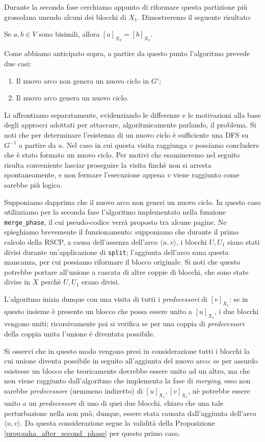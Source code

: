 Durante la seconda fase cerchiamo appunto di riformare questa partizione più grossolana unendo alcuni dei blocchi di $X_1$. Dimostreremo il seguente risultato:
\begin{proposition}
    \label{prop:saha_after_second_phase}
    Se $a,b \in V$ sono bisimili, allora $[a]_{X_2} = [b]_{X_2}$.
\end{proposition}

Come abbiamo anticipato sopra, a partire da questo punto l'algoritmo prevede due casi:
\begin{enumerate}
    \item Il nuovo arco non genera un nuovo ciclo in $G'$;
    \item Il nuovo arco genera un nuovo ciclo.
\end{enumerate}
Li affrontiamo separatamente, evidenziando le differenze e le motivazioni alla base degli approcci adottati per attaccare, algoritmicamente parlando, il problema. Si noti che per determinare l'esistenza di un nuovo ciclo è sufficiente una DFS su $G^{-1}$ a partire da $u$. Nel caso in cui questa visita raggiunga $v$ possiamo concludere che è stato formato un nuovo ciclo. Per motivi che esamineremo nel seguito risulta conveniente lasciar proseguire la visita finchè non si arresta spontaneamente, e non fermare l'esecuzione appena $v$ viene raggiunto come sarebbe più logico.

Supponiamo dapprima che il nuovo arco non generi un nuovo ciclo. In questo caso utilizziamo per la seconda fase l'algoritmo implementato nella funzione \texttt{merge\_phase}, il cui pseudo-codice verrà proposto tra alcune pagine. Ne spieghiamo brevemente il funzionamento: supponiamo che durante il primo calcolo della RSCP, a causa dell'assenza dell'arco $\langle u, v \rangle$, i blocchi $U,U_1$ siano stati divisi durante un'applicazione di \texttt{split}; l'aggiunta dell'arco sana questa mancanza, per cui possiamo riformare il blocco originale. Si noti che questo potrebbe portare all'unione a cascata di altre coppie di blocchi, che sono state divise in $X$ perchè $U,U_1$ erano divisi.

L'algoritmo inizia dunque con una visita di tutti i \emph{predecessori} di $[v]_{X_1}$: se in questo insieme è presente un blocco che possa essere unito a $[u]_{X_1}$, i due blocchi vengono uniti; ricorsivamente poi si verifica se per una coppia di \emph{predecessori} della coppia unita l'unione è diventata possibile.

Si osservi che in questo modo vengono presi in considerazione tutti i blocchi la cui unione diventa possibile in seguito all'aggiunta del nuovo arco: se per assurdo esistesse un blocco che teoricamente dovrebbe essere unito ad un altro, ma che non viene raggiunto dall'algoritmo che implementa la fase di \emph{merging}, esso non sarebbe \emph{predecessore} (nemmeno indiretto) di $[u]_{X_1}, [v]_{X_1}$, nè potrebbe essere unito a un \emph{predecessore} di uno di quei due blocchi. \accente chiaro che una tale perturbazione nella \rscpnomath non può, dunque, essere stata causata dall'aggiunta dell'arco $\langle u,v \rangle$. Da questa considerazione segue la validità della Proposizione \ref{prop:saha_after_second_phase} per questo primo caso.

